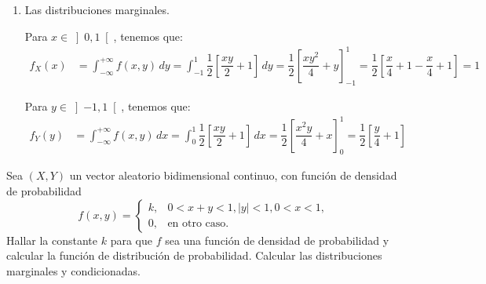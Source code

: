 \begin{ejercicio}
\begin{enumerate}
\begin{itemize}
            \item \ul{Si $y\geq 1$  $x\geq 1$} (zona $R_5$):
            \begin{equation*}
                F_{(X,Y)}(x, y) = 1.
            \end{equation*}
        \end{itemize}

        Por tanto, tenemos que:
        \begin{equation*}
            F_{(X,Y)}(x, y) = \begin{cases}
                0, & x\leq 0 \text{ o } y\leq -1, \\
                \dfrac{x^2y^2}{16}+\dfrac{xy}{2}-\dfrac{x^2}{16}+\dfrac{x}{2}, & x\in \left]0,1\right[ \text{ y } y\in \left]-1,1\right[, \\
                x, & x\in \left]0,1\right[ \text{ y } y\geq 1,\\
                \dfrac{y^2}{16}+\dfrac{y}{2}+\dfrac{7}{16}, & y\in \left]-1,1\right[ \text{ y } x\geq 1, \\
                1, & y\geq 1 \text{ y } x\geq 1.
            \end{cases}
        \end{equation*}
            

        \item Las distribuciones marginales.
        
        Para $x\in \left]0,1\right[$, tenemos que:
        \begin{align*}
            f_X(x) &= \int_{-\infty}^{+\infty} f(x, y) \, dy = \int_{-1}^{1} \dfrac{1}{2}\left[\dfrac{xy}{2}+1\right] \, dy = \dfrac{1}{2}\left[\dfrac{xy^2}{4}+y\right]_{-1}^1 = \dfrac{1}{2}\left[\dfrac{x}{4}+1-\dfrac{x}{4}+1\right] = 1
        \end{align*}

        Para $y\in \left]-1,1\right[$, tenemos que:
        \begin{align*}
            f_Y(y) &= \int_{-\infty}^{+\infty} f(x, y) \, dx = \int_{0}^{1} \dfrac{1}{2}\left[\dfrac{xy}{2}+1\right] \, dx = \dfrac{1}{2}\left[\dfrac{x^2y}{4}+x\right]_{0}^1 = \dfrac{1}{2}\left[\dfrac{y}{4}+1\right]
        \end{align*}
    \end{enumerate}
\end{ejercicio}

\begin{ejercicio}
    Sea $(X,Y)$ un vector aleatorio bidimensional continuo, con función de densidad de probabilidad
    \[
        f(x, y) = \begin{cases}
            k, & 0 < x + y < 1, |y| < 1, 0 < x < 1, \\
            0, & \text{en otro caso}.
        \end{cases}
    \]
    Hallar la constante $k$ para que $f$ sea una función de densidad de probabilidad y calcular la función de distribución de probabilidad. Calcular las distribuciones marginales y condicionadas.
\end{ejercicio}

